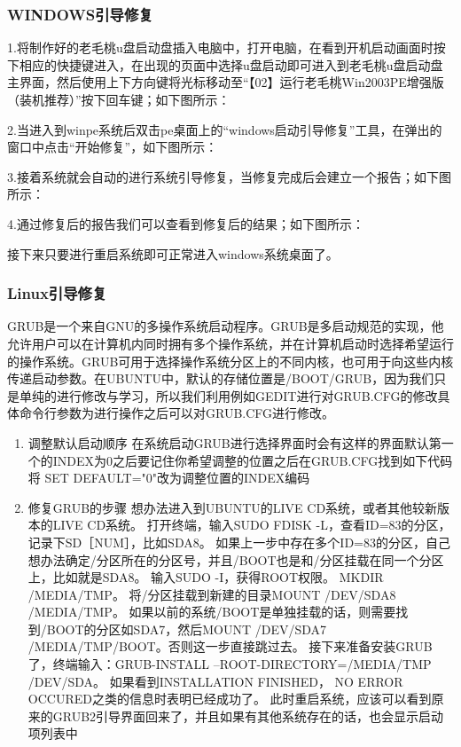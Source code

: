 \subsubsection{WINDOWS引导修复}


1.将制作好的老毛桃u盘启动盘插入电脑中，打开电脑，在看到开机启动画面时按下相应的快捷键进入，在出现的页面中选择u盘启动即可进入到老毛桃u盘启动盘主界面，然后使用上下方向键将光标移动至“【02】运行老毛桃Win2003PE增强版（装机推荐）”按下回车键；如下图所示：

2.当进入到winpe系统后双击pe桌面上的“windows启动引导修复”工具，在弹出的窗口中点击“开始修复”，如下图所示：

3.接着系统就会自动的进行系统引导修复，当修复完成后会建立一个报告；如下图所示：

4.通过修复后的报告我们可以查看到修复后的结果；如下图所示：

接下来只要进行重启系统即可正常进入windows系统桌面了。

\subsubsection{Linux引导修复}

GRUB是一个来自GNU的多操作系统启动程序。GRUB是多启动规范的实现，他允许用户可以在计算机内同时拥有多个操作系统，并在计算机启动时选择希望运行的操作系统。GRUB可用于选择操作系统分区上的不同内核，也可用于向这些内核传递启动参数。在UBUNTU中，默认的存储位置是/BOOT/GRUB，因为我们只是单纯的进行修改与学习，所以我们利用例如GEDIT进行对GRUB.CFG的修改具体命令行参数为进行操作之后可以对GRUB.CFG进行修改。

\begin{enumerate}
	\item 调整默认启动顺序
	在系统启动GRUB进行选择界面时会有这样的界面默认第一个的INDEX为0之后要记住你希望调整的位置之后在GRUB.CFG找到如下代码
	将 SET DEFAULT="0"改为调整位置的INDEX编码
	\item 修复GRUB的步骤
	\subitem 想办法进入到UBUNTU的LIVE CD系统，或者其他较新版本的LIVE CD系统。
	\subitem 打开终端，输入SUDO FDISK -L，查看ID=83的分区，记录下SD［NUM］，比如SDA8。
	\subitem 如果上一步中存在多个ID=83的分区，自己想办法确定/分区所在的分区号，并且/BOOT也是和/分区挂载在同一个分区上，比如就是SDA8。
	\subitem 输入SUDO -I，获得ROOT权限。
	\subitem MKDIR /MEDIA/TMP。
	\subitem 将/分区挂载到新建的目录MOUNT /DEV/SDA8 /MEDIA/TMP。
	\subitem 如果以前的系统/BOOT是单独挂载的话，则需要找到/BOOT的分区如SDA7，然后MOUNT /DEV/SDA7 /MEDIA/TMP/BOOT。否则这一步直接跳过去。
	\subitem 接下来准备安装GRUB了，终端输入：GRUB-INSTALL --ROOT-DIRECTORY=/MEDIA/TMP /DEV/SDA。
	\subitem 如果看到INSTALLATION FINISHED， NO ERROR OCCURED之类的信息时表明已经成功了。
	\subitem 此时重启系统，应该可以看到原来的GRUB2引导界面回来了，并且如果有其他系统存在的话，也会显示启动项列表中
\end{enumerate}




